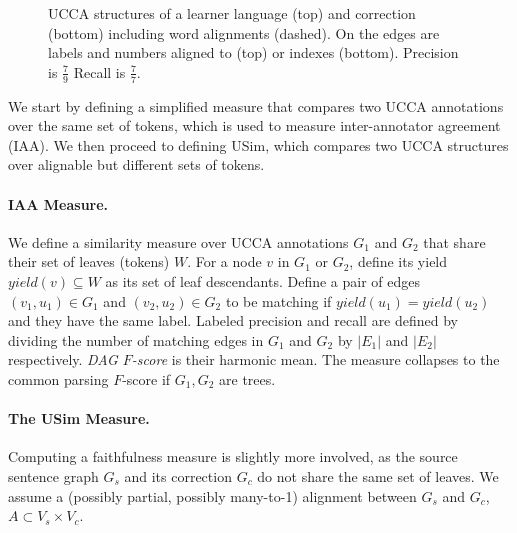 \documentclass[a4paper, 11pt]{article}
\begin{document}
\begin{figure}[t]
				\caption{\label{fig:example}
					UCCA structures of a learner language (top) and correction (bottom) including word alignments (dashed). On the edges are labels and numbers aligned to (top) or indexes (bottom). Precision is $\frac{7}{9}$ Recall is $\frac{7}{7}$.
				}
			\end{figure}
We start by defining a simplified measure that compares two UCCA annotations over the 
same set of tokens, which is used to measure inter-annotator agreement (IAA). We then
proceed to defining {\sc USim}, which compares two UCCA structures
over alignable but different sets of tokens.

\paragraph{IAA Measure.} We define a similarity measure over UCCA annotations 
$G_1$ and $G_2$ that share their set of leaves (tokens) $W$.
For a node $v$ in $G_1$ or $G_2$, define its yield $yield(v) \subseteq W$ as its
set of leaf descendants.
Define a pair of edges $(v_1,u_1) \in G_1$ and $(v_2,u_2) \in G_2$ to be matching
if $yield(u_1) = yield(u_2)$ and they have the same label.
Labeled precision and recall are defined by dividing the number of matching edges
in $G_1$ and $G_2$ by $|E_1|$ and $|E_2|$ respectively.
{\it DAG $F$-score} is their harmonic mean.
The measure collapses to the common parsing $F$-score if $G_1, G_2$ are trees.

\paragraph{The {\sc USim} Measure.} Computing a faithfulness
measure is slightly more involved, as the source sentence graph $G_s$ and its
correction $G_c$ do not share the same set of leaves.
%
%
We assume a (possibly partial, possibly many-to-1) alignment between $G_s$ and $G_c$,
$A \subset V_s \times V_c$. 
\end{document}
